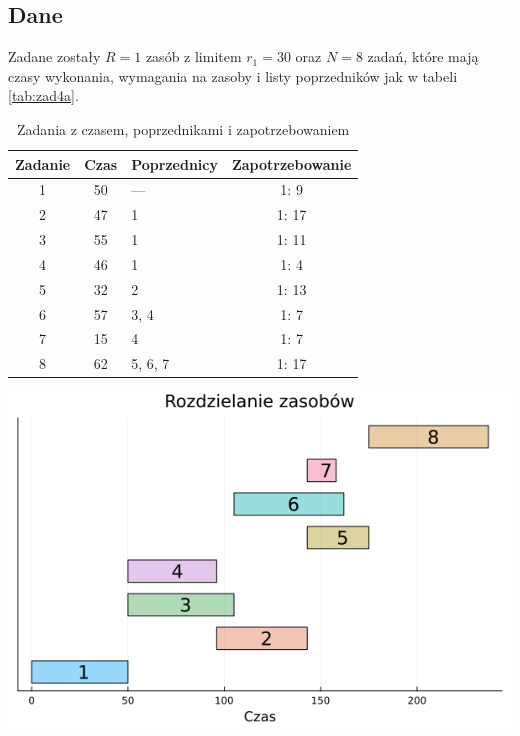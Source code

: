 \documentclass{article}
\begin{document}
\subsection{Dane}
Zadane zostały $R = 1$ zasób z limitem $r_1 = 30$ oraz $N = 8$ zadań, które mają czasy wykonania, wymagania na zasoby i listy poprzedników jak w tabeli \ref{tab:zad4a}.
\begin{table}[h]
    \centering
    \begin{minipage}[t]{0.4\textwidth}
        \centering
        \begin{tabular}{c|c|l|c}
            Zadanie & Czas & Poprzednicy & Zapotrzebowanie \\
            \hline
            1 & 50 & ---     & 1: 9 \\
            2 & 47 & 1       & 1: 17 \\
            3 & 55 & 1       & 1: 11 \\
            4 & 46 & 1       & 1: 4 \\
            5 & 32 & 2       & 1: 13 \\
            6 & 57 & 3, 4    & 1: 7 \\
            7 & 15 & 4       & 1: 7 \\
            8 & 62 & 5, 6, 7 & 1: 17 \\
        \end{tabular}
        \caption{Zadania z czasem, poprzednikami i zapotrzebowaniem}
        \label{tab:zad4a}
    \end{minipage}
    \hfill
    \begin{minipage}{0.4\textwidth}
        \centering
        \includegraphics[width=\linewidth]{../rozdzielanie_zasobow/wynik.png}
        \label{fig:zad4b}
    \end{minipage}
\end{table}
\end{document}
